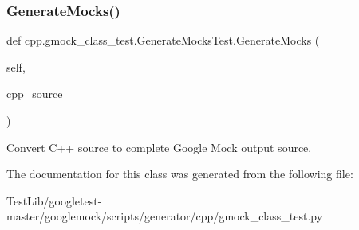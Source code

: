 \subsubsection{\texorpdfstring{Generate\+Mocks()}{GenerateMocks()}}
{\footnotesize\ttfamily def cpp.\+gmock\+\_\+class\+\_\+test.\+Generate\+Mocks\+Test.\+Generate\+Mocks (\begin{DoxyParamCaption}\item[{}]{self,  }\item[{}]{cpp\+\_\+source }\end{DoxyParamCaption})}

\begin{DoxyVerb}Convert C++ source to complete Google Mock output source.\end{DoxyVerb}
 

The documentation for this class was generated from the following file\+:\begin{DoxyCompactItemize}
\item 
Test\+Lib/googletest-\/master/googlemock/scripts/generator/cpp/gmock\+\_\+class\+\_\+test.\+py\end{DoxyCompactItemize}
